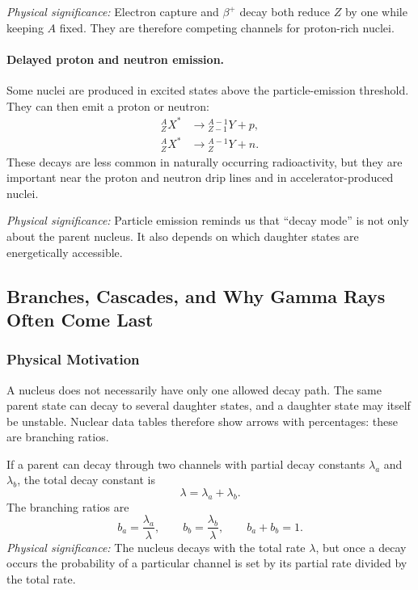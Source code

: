 \textit{Physical significance:} Electron capture and $\beta^{+}$ decay both
reduce $Z$ by one while keeping $A$ fixed.  They are therefore competing
channels for proton-rich nuclei.

\paragraph{Delayed proton and neutron emission.}
Some nuclei are produced in excited states above the particle-emission
threshold.  They can then emit a proton or neutron:
\begin{align}
  \label{eq:lec05:proton_emission}
  {}^{A}_{Z}X^{*} &\rightarrow{}^{A-1}_{Z-1}Y+p,\\
  \label{eq:lec05:neutron_emission}
  {}^{A}_{Z}X^{*} &\rightarrow{}^{A-1}_{Z}Y+n.
\end{align}
These decays are less common in naturally occurring radioactivity, but they are
important near the proton and neutron drip lines and in accelerator-produced
nuclei.

\textit{Physical significance:} Particle emission reminds us that ``decay
mode'' is not only about the parent nucleus.  It also depends on which daughter
states are energetically accessible.

\subsection{Branches, Cascades, and Why Gamma Rays Often Come Last}
\label{subsec:lec05:branches}

\subsubsection*{Physical Motivation}
A nucleus does not necessarily have only one allowed decay path.  The same
parent state can decay to several daughter states, and a daughter state may
itself be unstable.  Nuclear data tables therefore show arrows with
percentages: these are branching ratios.

If a parent can decay through two channels with partial decay constants
\(\lambda_a\) and \(\lambda_b\), the total decay constant is
\begin{equation}
  \label{eq:lec05:partial_lambdas}
  \boxed{\lambda=\lambda_a+\lambda_b.}
\end{equation}
The branching ratios are
\begin{equation}
  \label{eq:lec05:branching_ratios}
  \boxed{b_a=\frac{\lambda_a}{\lambda},\qquad
  b_b=\frac{\lambda_b}{\lambda},\qquad b_a+b_b=1.}
\end{equation}
\textit{Physical significance:} The nucleus decays with the total rate
\(\lambda\), but once a decay occurs the probability of a particular channel is
set by its partial rate divided by the total rate.


